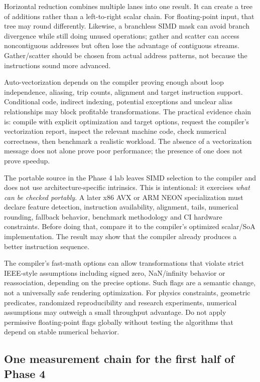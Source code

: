 Horizontal reduction combines multiple lanes into one result. It can create a tree of additions rather than a left-to-right scalar chain. For floating-point input, that tree may round differently. Likewise, a branchless SIMD mask can avoid branch divergence while still doing unused operations; gather and scatter can access noncontiguous addresses but often lose the advantage of contiguous streams. Gather/scatter should be chosen from actual address patterns, not because the instructions sound more advanced.

Auto-vectorization depends on the compiler proving enough about loop independence, aliasing, trip counts, alignment and target instruction support. Conditional code, indirect indexing, potential exceptions and unclear alias relationships may block profitable transformations. The practical evidence chain is: compile with explicit optimization and target options, request the compiler's vectorization report, inspect the relevant machine code, check numerical correctness, then benchmark a realistic workload. The absence of a vectorization message does not alone prove poor performance; the presence of one does not prove speedup.

The portable source in the Phase 4 lab leaves SIMD selection to the compiler and does not use architecture-specific intrinsics. This is intentional: it exercises \emph{what can be checked portably}. A later x86 AVX or ARM NEON specialization must declare feature detection, instruction availability, alignment, tails, numerical rounding, fallback behavior, benchmark methodology and CI hardware constraints. Before doing that, compare it to the compiler's optimized scalar/SoA implementation. The result may show that the compiler already produces a better instruction sequence.

The compiler's fast-math options can allow transformations that violate strict IEEE-style assumptions including signed zero, NaN/infinity behavior or reassociation, depending on the precise options. Such flags are a semantic change, not a universally safe rendering optimization. For physics constraints, geometric predicates, randomized reproducibility and research experiments, numerical assumptions may outweigh a small throughput advantage. Do not apply permissive floating-point flags globally without testing the algorithms that depend on stable numerical behavior.

\subsection{One measurement chain for the first half of Phase 4}\label{01-foundations-i-ch007-one-measurement-chain-for-the-first-half-of-phase-4}

